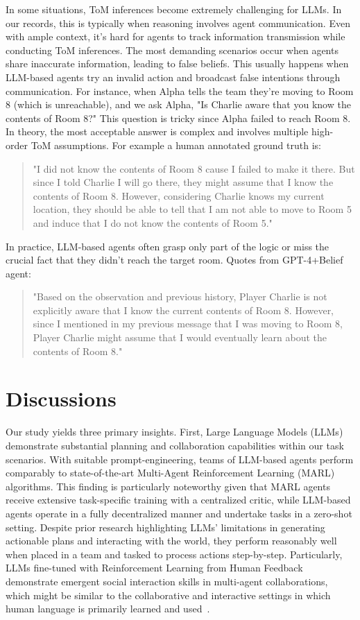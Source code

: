 \documentclass[11pt]{article}
\begin{document}
In some situations, ToM inferences become extremely challenging for LLMs. In our records, this is typically when reasoning involves agent communication. Even with ample context, it's hard for agents to track information transmission while conducting ToM inferences. The most demanding scenarios occur when agents share inaccurate information, leading to false beliefs. This usually happens when LLM-based agents try an invalid action and broadcast false intentions through communication. For instance, when Alpha tells the team they're moving to Room 8 (which is unreachable), and we ask Alpha, "Is Charlie aware that you know the contents of Room 8?" This question is tricky since Alpha failed to reach Room 8. In theory, the most acceptable answer is complex and involves multiple high-order ToM assumptions. For example a human annotated ground truth is:
\begin{quote}
"I did not know the contents of Room 8 cause I failed to make it there. But since I told Charlie I will go there, they might assume that I know the contents of Room 8. However, considering Charlie knows my current location, they should be able to tell that I am not able to move to Room 5 and induce that I do not know the contents of Room 5."
\end{quote}
In practice, LLM-based agents often grasp only part of the logic or miss the crucial fact that they didn't reach the target room. Quotes from GPT-4+Belief agent:
\begin{quote}
"Based on the observation and previous history, Player Charlie is not explicitly aware that I know the current contents of Room 8. However, since I mentioned in my previous message that I was moving to Room 8, Player Charlie might assume that I would eventually learn about the contents of Room 8."
\end{quote}



\section{Discussions}
Our study yields three primary insights. First, Large Language Models (LLMs) demonstrate substantial planning and collaboration capabilities within our task scenarios. With suitable prompt-engineering, teams of LLM-based agents perform comparably to state-of-the-art Multi-Agent Reinforcement Learning (MARL) algorithms. This finding is particularly noteworthy given that MARL agents receive extensive task-specific training with a centralized critic, while LLM-based agents operate in a fully decentralized manner and undertake tasks in a zero-shot setting. Despite prior research highlighting LLMs' limitations in generating actionable plans and interacting with the world, they perform reasonably well when placed in a team and tasked to process actions step-by-step. Particularly, LLMs fine-tuned with Reinforcement Learning from Human Feedback demonstrate emergent social interaction skills in multi-agent collaborations, which might be similar to the collaborative and interactive settings in which human language is primarily learned and used~\cite{sap2023neural}.
\end{document}
